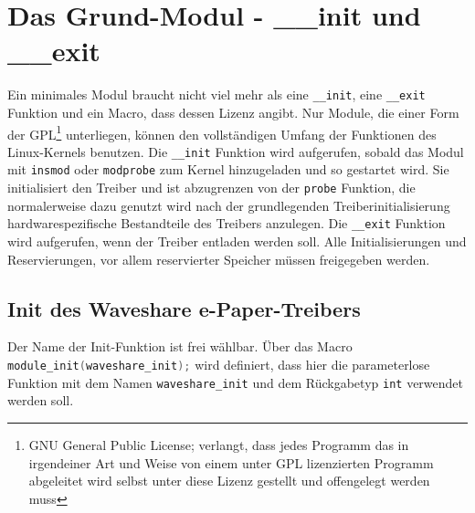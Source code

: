 
\section{Das Grund-Modul - {\_\_}init und {\_\_}exit}
Ein minimales Modul braucht nicht viel mehr als eine \texttt{__init}, eine \texttt{__exit} Funktion und ein Macro, dass dessen Lizenz angibt. Nur Module, die einer Form der GPL\footnote{GNU General Public License; verlangt, dass jedes Programm das in irgendeiner Art und Weise von einem unter GPL lizenzierten Programm abgeleitet wird selbst unter diese Lizenz gestellt und offengelegt werden muss} unterliegen, können den vollständigen Umfang der Funktionen des Linux-Kernels benutzen. %
Die \texttt{__init} Funktion wird aufgerufen, sobald das Modul mit \texttt{insmod} oder \texttt{modprobe} zum Kernel hinzugeladen und so gestartet wird. Sie initialisiert den Treiber und ist abzugrenzen von der \texttt{probe} Funktion, die normalerweise dazu genutzt wird nach der grundlegenden Treiberinitialisierung hardwarespezifische Bestandteile des Treibers anzulegen. 
Die \texttt{__exit} Funktion wird aufgerufen, wenn der Treiber entladen werden soll. Alle Initialisierungen und Reservierungen, vor allem reservierter Speicher müssen freigegeben werden. 

\subsection{Init des Waveshare e-Paper-Treibers}
Der Name der Init-Funktion ist frei wählbar. Über das Macro \\ 
\mintinline {c}{module_init(waveshare_init);} wird  definiert, dass hier die parameterlose Funktion mit dem Namen \texttt{waveshare\_init} und dem Rückgabetyp \texttt{int} verwendet werden soll. 

